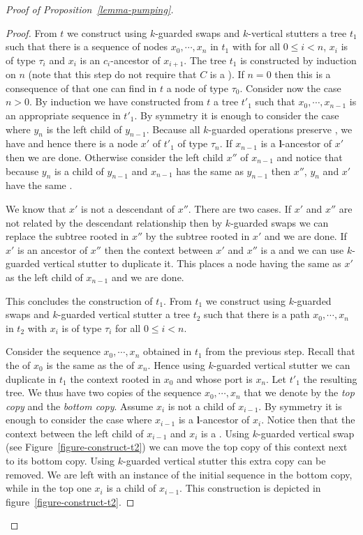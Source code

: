 \begin{proof}[Proof of Proposition~\ref{lemma-pumping}]
\begin{proof}
  From $t$ we construct using $k$-guarded swaps and $k$-vertical stutters a
  tree $t_1$ such that there is a sequence of nodes $x_0,\cdots,x_n$ in $t_1$
  with for all $0\leq i < n$, $x_i$ is of type $\tau_i$ and $x_i$ is an
  $c_i$-ancestor of $x_{i+1}$. The tree $t_1$ is constructed by induction on
  $n$ (note that this step do not require that $C$ is a \kloop).
  If $n=0$ then this is a consequence of  that one
  can find in $t$ a node of type $\tau_0$.  Consider now the case $n>0$. By
  induction we have constructed from $t$ a tree $t'_1$ such that
  $x_0,\cdots,x_{n-1}$ is an appropriate sequence in $t'_1$.  By symmetry it is
  enough to consider the case where $y_{n}$ is the left child of $y_{n-1}$.
  Because all $k$-guarded operations preserve , we have
   and hence there is a node $x'$ of $t'_1$ of type
  $\tau_n$. If $x_{n-1}$ is a {\bf l}-ancestor of $x'$ then we are done.
  Otherwise consider the left child $x''$ of $x_{n-1}$ and notice that because $y_{n}$
  is a child of $y_{n-1}$ and $x_{n-1}$ has the same  as
  $y_{n-1}$ then $x''$, $y_n$ and $x'$ have the same \ktype.

  We know that $x'$ is not a descendant of $x''$. There are two cases. If $x'$ and $x''$
  are not related by the descendant relationship then by $k$-guarded swaps we
  can replace the subtree rooted in $x''$ by the subtree rooted in $x'$ and we
  are done. If $x'$ is an ancestor of $x''$ then the context between $x'$ and $x''$
  is a \kloop and we can use $k$-guarded vertical stutter to duplicate
  it. This places a node having the same  as $x'$ as the left child of $x_{n-1}$ and we are done.

  \noindent This concludes the construction of $t_1$. From $t_1$ we construct using
  $k$-guarded swaps and $k$-guarded vertical stutter a tree $t_2$ such that
  there is a path $x_0,\cdots,x_n$ in $t_2$ with $x_i$ is of type $\tau_i$
  for all $0\leq i < n$.

  Consider the sequence $x_0,\cdots,x_n$ obtained in $t_1$ from the previous
  step. Recall that the \ktype of $x_0$ is the same as the \ktype of $x_n$.
  Hence using $k$-guarded vertical stutter we can duplicate in $t_1$ the
  context rooted in $x_0$ and whose port is $x_n$. Let $t'_1$ the resulting
  tree. We thus have two copies of the sequence $x_0,\cdots,x_n$ that we denote
  by the \emph{top copy} and the \emph{bottom copy}. Assume $x_i$ is not a
  child of $x_{i-1}$. By symmetry it is enough to consider the case where
  $x_{i-1}$ is a {\bf l}-ancestor of $x_i$. Notice then that the context
  between the left child of $x_{i-1}$ and $x_i$ is a \kloop. Using $k$-guarded
  vertical swap (see Figure~\ref{figure-construct-t2}) we can move the top copy
  of this context next to its bottom copy. Using $k$-guarded vertical stutter
  this extra copy can be removed. We are left with an instance of the initial
  sequence in the bottom copy, while in the top one $x_i$ is a child of
  $x_{i-1}$.  This construction is depicted in
  figure~\ref{figure-construct-t2}.


\end{proof}
\end{proof}
